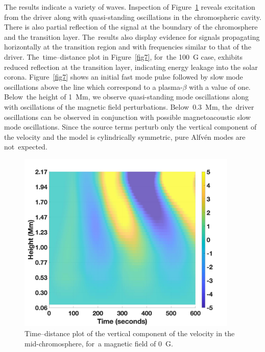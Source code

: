 \documentclass[physics,article,accept,pdftex,moreauthors]{Definitions/mdpi}
\begin{document}
The results indicate a variety of waves. Inspection of Figure~\ref{fig8} reveals excitation from the driver along with quasi-standing oscillations in the chromospheric cavity. There is also partial reflection of the signal at the boundary of the chromosphere and the transition layer. The~results also display evidence for signals propagating horizontally at the transition region and with frequencies similar to that of the driver. The~time--distance plot in Figure~\ref{fig7}, for~the 100~G case, exhibits reduced reflection at the transition layer, indicating energy leakage into the solar corona. Figure~\ref{fig7} shows an initial fast mode pulse followed by slow mode oscillations above the line which correspond to a plasma-$\beta$ with a value of one. Below~the height of 1~Mm, we observe quasi-standing mode oscillations along with oscillations of the magnetic field perturbations. Below~0.3~Mm, the~driver oscillations can be observed in conjunction with possible magnetoacoustic slow mode oscillations. Since the source terms perturb only the vertical component of the velocity and the model is cylindrically symmetric, pure Alfv\'en modes are not~expected.






\begin{figure}[H]
\includegraphics[width=10.5cm]{td_vert_bv0G_300.jpg}
\caption{{Time--distance} %
 plot of the vertical component of the velocity in the mid-chromosphere, for~a magnetic field of 0~G.\label{fig8}}
\end{figure}
\end{document}
